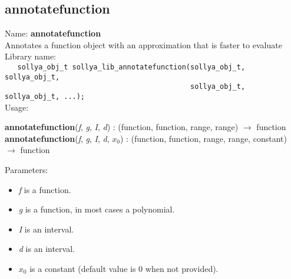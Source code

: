 \subsection{annotatefunction}
\label{labannotatefunction}
\noindent Name: \textbf{annotatefunction}\\
\phantom{aaa}Annotates a \sollya function object with an approximation that is faster to evaluate\\[0.2cm]
\noindent Library name:\\
\verb|   sollya_obj_t sollya_lib_annotatefunction(sollya_obj_t, sollya_obj_t,|\\
\verb|                                            sollya_obj_t, sollya_obj_t, ...);|\\[0.2cm]
\noindent Usage: 
\begin{center}
\textbf{annotatefunction}(\emph{f}, \emph{g}, \emph{I}, \emph{d}) : (\textsf{function}, \textsf{function}, \textsf{range}, \textsf{range}) $\rightarrow$ \textsf{function}\\
\textbf{annotatefunction}(\emph{f}, \emph{g}, \emph{I}, \emph{d}, \emph{$x_0$}) : (\textsf{function}, \textsf{function}, \textsf{range}, \textsf{range}, \textsf{constant}) $\rightarrow$ \textsf{function}\\
\end{center}
Parameters: 
\begin{itemize}
\item \emph{f} is a function.
\item \emph{g} is a function, in most cases a polynomial.
\item \emph{I} is an interval.
\item \emph{d} is an interval.
\item \emph{$x_0$} is a constant (default value is $0$ when not provided).
\end{itemize}
